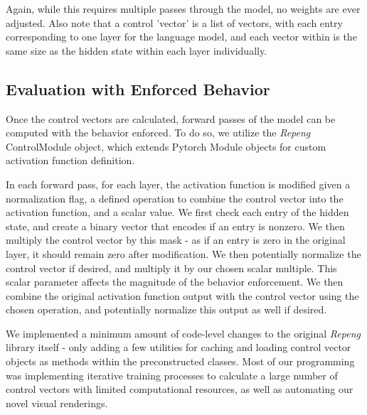 \documentclass[11pt,a4paper]{article}
\begin{document}
Again, while this requires multiple passes through the model, no weights are ever adjusted. Also note that a control 'vector' is a list of vectors, with each entry corresponding to one layer for the language model, and each vector within is the same size as the hidden state within each layer individually.

\subsection{Evaluation with Enforced Behavior}
Once the control vectors are calculated, forward passes of the model can be computed with the behavior enforced. To do so, we utilize the \emph{Repeng} ControlModule object, which extends Pytorch Module objects for custom activation function definition. 

In each forward pass, for each layer, the activation function is modified given a normalization flag, a defined operation to combine the control vector into the activation function, and a scalar value. We first check each entry of the hidden state, and create a binary vector that encodes if an entry is nonzero. We then multiply the control vector by this mask - as if an entry is zero in the original layer, it should remain zero after modification. We then potentially normalize the control vector if desired, and multiply it by our chosen scalar multiple. This scalar parameter affects the magnitude of the behavior enforcement. We then combine the original activation function output with the control vector using the chosen operation, and potentially normalize this output as well if desired.

We implemented a minimum amount of code-level changes to the original \emph{Repeng} library itself - only adding a few utilities for caching and loading control vector objects as methods within the preconstructed classes. Most of our programming was implementing iterative training processes to calculate a large number of control vectors with limited computational resources, as well as automating our novel visual renderings.
\end{document}
